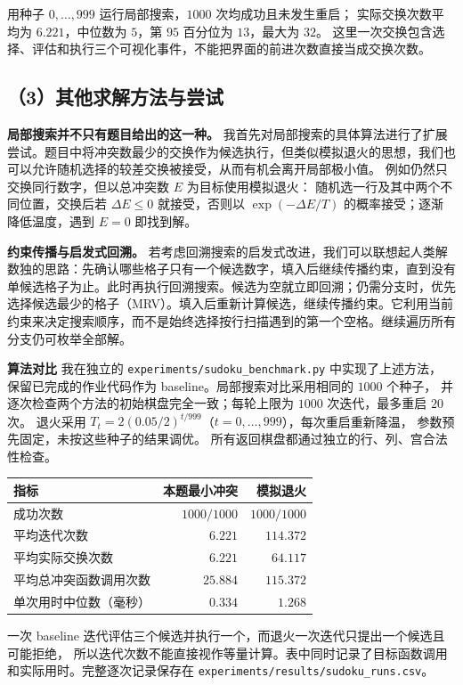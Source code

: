 \documentclass[utf8]{ctexart}
\theoremstyle{mystyle}
\begin{document}
用种子 $0,\ldots,999$ 运行局部搜索，$1000$ 次均成功且未发生重启；
实际交换次数平均为 $6.221$，中位数为 $5$，第 $95$ 百分位为 $13$，最大为 $32$。
这里一次交换包含选择、评估和执行三个可视化事件，不能把界面的前进次数直接当成交换次数。

\subsection*{（3）其他求解方法与尝试}
\noindent\textbf{局部搜索并不只有题目给出的这一种。}
我首先对局部搜索的具体算法进行了扩展尝试。题目中将冲突数最少的交换作为候选执行，但类似模拟退火的思想，我们也可以允许随机选择的较差交换被接受，从而有机会离开局部极小值。
例如仍然只交换同行数字，但以总冲突数 $E$ 为目标使用模拟退火：
随机选一行及其中两个不同位置，交换后若 $\Delta E\le0$ 就接受，否则以
$\exp(-\Delta E/T)$ 的概率接受；逐渐降低温度，遇到 $E=0$ 即找到解。

\medskip
\noindent\textbf{约束传播与启发式回溯。}
若考虑回溯搜索的启发式改进，我们可以联想起人类解数独的思路：先确认哪些格子只有一个候选数字，填入后继续传播约束，直到没有单候选格子为止。此时再执行回溯搜索。候选为空就立即回溯；仍需分支时，优先选择候选最少的格子（MRV）。填入后重新计算候选，继续传播约束。它利用当前约束来决定搜索顺序，而不是始终选择按行扫描遇到的第一个空格。继续遍历所有分支仍可枚举全部解。

\medskip
\noindent\textbf{算法对比}
我在独立的 \texttt{experiments/sudoku\_benchmark.py} 中实现了上述方法，
保留已完成的作业代码作为 baseline。局部搜索对比采用相同的 $1000$ 个种子，
并逐次检查两个方法的初始棋盘完全一致；每轮上限为 $1000$ 次迭代，最多重启 $20$ 次。
退火采用 $T_t=2(0.05/2)^{t/999}$（$t=0,\ldots,999$），每次重启重新降温，
参数预先固定，未按这些种子的结果调优。
所有返回棋盘都通过独立的行、列、宫合法性检查。
\begin{center}
\begin{tabular}{lrr}
\toprule
指标 & 本题最小冲突 & 模拟退火\\
\midrule
成功次数 & $1000/1000$ & $1000/1000$\\
平均迭代次数 & $6.221$ & $114.372$\\
平均实际交换次数 & $6.221$ & $64.117$\\
平均总冲突函数调用次数 & $25.884$ & $115.372$\\
单次用时中位数（毫秒） & $0.334$ & $1.268$\\
\bottomrule
\end{tabular}
\end{center}
一次 baseline 迭代评估三个候选并执行一个，而退火一次迭代只提出一个候选且可能拒绝，
所以迭代次数不能直接视作等量计算。表中同时记录了目标函数调用和实际用时。完整逐次记录保存在
\texttt{experiments/results/sudoku\_runs.csv}。
\end{document}
